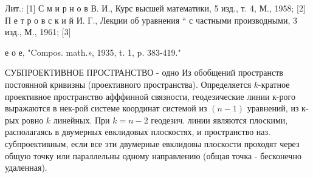 \documentclass[10pt]{article}
\begin{document}
Лит.: [1] С м и р н о в В. И., Курс высшей математики, 5 изд., т. 4, М., 1958; [2] П е т р о в с к и й И. Г., Лекџии об уравнения “ с частными производными, 3 изд., М., 1961; [3]

е о е, "Compos. math.», 1935, t. 1, p. 383-419."



СУБПРОЕКТИВНОЕ ПРОСТРАНСТВО - одно Из обобщений пространств постоянной кривизны (проективного пространства). Определяется $k$-кратное проективное пространство афффинной связности, геодезические линии к-рого выражаются в нек-рой системе координат системой из $(n-1)$ уравнений, из к-рых ровно $k$ линейных. При $k=n-2$ геодезич. линии являются плоскими, располагаясь в двумерных евклидовых плоскостях, и пространство наз. субпроективным, если все эти двумерные евклидовы плоскости проходят через общую точку или параллельны одному направлению (общая точка - бесконечно удаленная).
\end{document}

